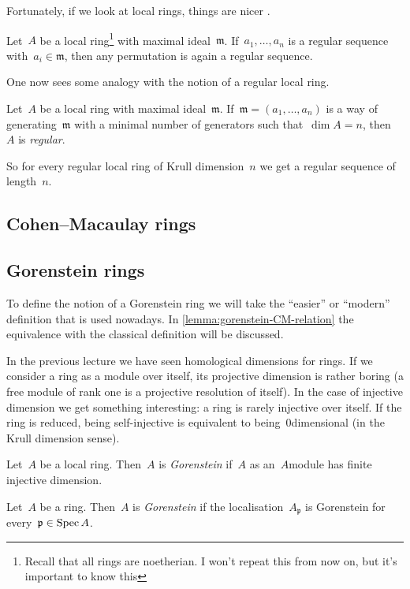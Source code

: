 \documentclass[10pt,a4paper]{article}
\begin{document}
Fortunately, if we look at local rings, things are nicer \cite[corollary 17.2]{eisenbud-commutative-algebra}.
\begin{corollary}
  Let~$A$ be a local ring\footnote{Recall that all rings are noetherian. I won't repeat this from now on, but it's important to know this} with maximal ideal~$\mathfrak{m}$. If~$a_1,\dotsc,a_n$ is a regular sequence with~$a_i\in\mathfrak{m}$, then any permutation is again a regular sequence.
\end{corollary}
One now sees some analogy with the notion of a regular local ring.
\begin{definition}
  Let~$A$ be a local ring with maximal ideal~$\mathfrak{m}$. If~$\mathfrak{m}=(a_1,\dotsc,a_n)$ is a way of generating~$\mathfrak{m}$ with a minimal number of generators such that~$\dim A=n$, then~$A$ is \emph{regular}.
\end{definition}
So for every regular local ring of Krull dimension~$n$ we get a regular sequence of length~$n$.


\subsection{Cohen--Macaulay rings}

\subsection{Gorenstein rings}
To define the notion of a Gorenstein ring we will take the ``easier'' or ``modern'' definition that is used nowadays. In \cref{lemma:gorenstein-CM-relation} the equivalence with the classical definition will be discussed.

In the previous lecture we have seen homological dimensions for rings. If we consider a ring as a module over itself, its projective dimension is rather boring (a free module of rank one is a projective resolution of itself). In the case of injective dimension we get something interesting: a ring is rarely injective over itself. If the ring is reduced, being self-injective is equivalent to being~$0$\dash dimensional (in the Krull dimension sense).

\begin{definition}
  Let~$A$ be a local ring. Then~$A$ is \emph{Gorenstein} if~$A$ as an~$A$\dash module has finite injective dimension.
  
  Let~$A$ be a ring. Then~$A$ is \emph{Gorenstein} if the localisation~$A_{\mathfrak{p}}$ is Gorenstein for every~$\mathfrak{p}\in\operatorname{Spec} A$.
\end{definition}
\end{document}
